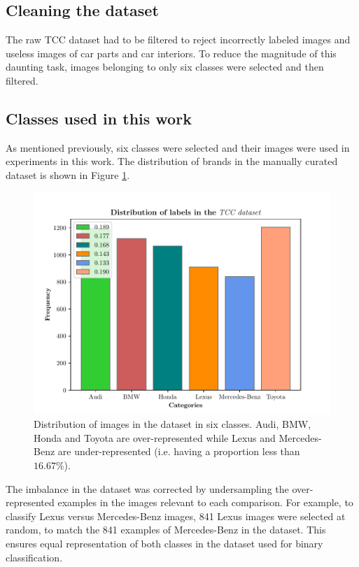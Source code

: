 \documentclass[conference]{IEEEtran}
\begin{document}
\subsection{Cleaning the dataset}
The raw TCC dataset had to be filtered to reject incorrectly labeled images and useless images of car parts and car interiors. To reduce the magnitude of this daunting task, images belonging to only six classes were selected and then filtered. 

\subsection{Classes used in this work} \label{cla}
As mentioned previously, six classes were selected and their images were used in experiments in this work. The distribution of brands in the manually curated dataset is shown in Figure \ref{fig:distrib}.

\begin{figure}[t]
	\centering
	\includegraphics[scale=0.42]{main16edaootable.pdf}
	\caption{Distribution of images in the dataset in six classes. Audi, BMW, Honda and Toyota are over-represented while Lexus and Mercedes-Benz are under-represented (i.e. having a proportion less than $16.67\%$).} 
	\label{fig:distrib}
\end{figure}

The imbalance in the dataset was corrected by undersampling the over-represented examples in the images relevant to each comparison. For example, to classify Lexus versus Mercedes-Benz images, 841 Lexus images were selected at random, to match the 841 examples of Mercedes-Benz in the dataset. This ensures equal representation of both classes in the dataset used for binary classification.
\end{document}
